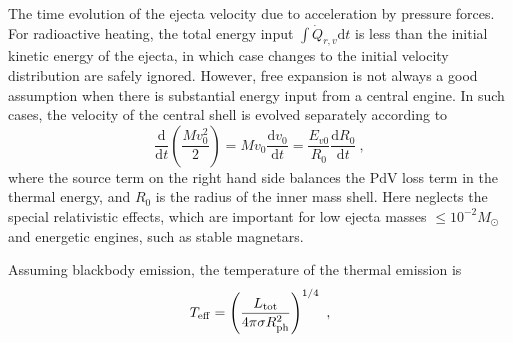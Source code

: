 \documentclass[11pt,a4paper]{article}
\newcommand{\dif}{\mathrm{d}}
\begin{document}
The time evolution of the ejecta velocity due to acceleration by pressure forces. For radioactive heating, the total energy input $\int \dot{Q}_{r,v} \dif t$ is less than the initial kinetic energy of the ejecta, in which case changes to the initial velocity distribution are safely ignored. However, free expansion is not always a good assumption when there is substantial energy input from a central engine. In such cases, the velocity of the central shell is evolved separately according to
\begin{equation}
\dfrac{\dif }{\dif t} \left( \dfrac{Mv_0^2}{2} \right) = M v_0 \dfrac{\dif v_0}{\dif t} = \dfrac{E_{v0}}{R_0} \dfrac{\dif R_0}{\dif t} ~,
\end{equation}
where the source term on the right hand side balances the PdV loss term in the thermal energy, and $R_0$ is the radius of the inner mass shell. Here neglects the special relativistic effects, which are important for low ejecta masses $\leqslant 10^{-2} M_\odot$ and energetic engines, such as stable magnetars.

Assuming blackbody emission, the temperature of the thermal emission is
\begin{equation}
T_{\rm eff} = \left( \dfrac{L_{\rm tot} }{4 \pi \sigma R^2_{\rm ph}} \right)^{1/4} ~,
\end{equation}























































\end{document}
